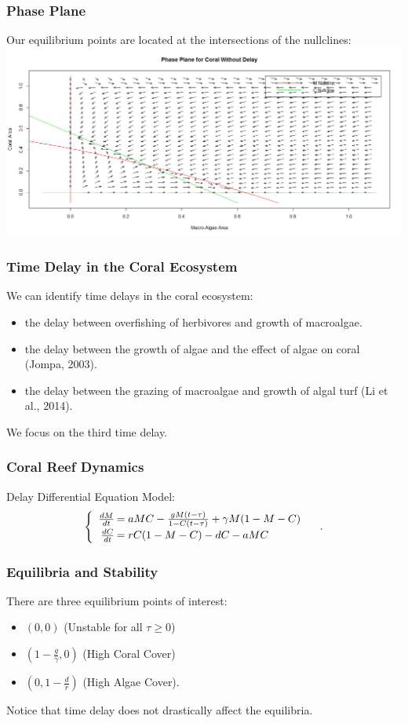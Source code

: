 \documentclass{beamer}
\begin{document}
\begin{frame}\frametitle{Phase Plane} Our equilibrium points are located at the intersections of the nullclines:
\includegraphics[scale=.22]{./nullclines.png}
\end{frame}

\begin{frame}
\frametitle{Time Delay in the Coral Ecosystem}
We can identify time delays in the coral ecosystem:
\begin{itemize}
\item the delay between overfishing of herbivores and growth of macroalgae.\\
\item the delay between the growth of algae and the effect of algae on coral (Jompa, 2003).\\
\item the delay between the grazing of macroalgae and growth of algal turf (Li et al., 2014).
\end{itemize} We focus on the third time delay.
\end{frame}

\begin{frame}\frametitle{Coral Reef Dynamics}
Delay Differential Equation Model:
$$\begin{cases}
\begin{array}{rl}
\frac{dM}{dt}\hspace{-.8em}&=aMC - \frac{gM(t-\tau)}{1-C(t-\tau)} + \gamma M (1-M-C)\\
\frac{dC}{dt}\hspace{-.8em}&=rC(1-M-C) - dC - aMC\\
\end{array}
\end{cases}.$$
\end{frame}

\begin{frame}
\frametitle{Equilibria and Stability}
There are three equilibrium points of interest: \begin{itemize}
\item $(0,0)$ (Unstable for all $\tau\geq0$)\\
\item $(1-\frac{g}{\gamma},0)$ (High Coral Cover)\\
\item $(0,1-\frac{d}{r})$ (High Algae Cover).
\end{itemize} Notice that time delay does not drastically affect the equilibria.
\end{frame}
\end{document}
